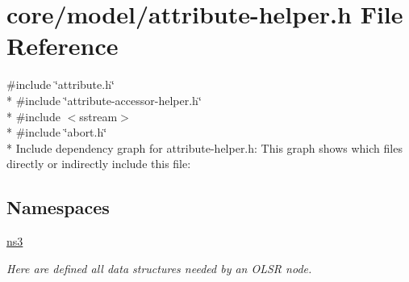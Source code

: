 \hypertarget{attribute-helper_8h}{}\section{core/model/attribute-\/helper.h File Reference}
\label{attribute-helper_8h}
{\ttfamily \#include \char`\"{}attribute.\+h\char`\"{}}\\*
{\ttfamily \#include \char`\"{}attribute-\/accessor-\/helper.\+h\char`\"{}}\\*
{\ttfamily \#include $<$sstream$>$}\\*
{\ttfamily \#include \char`\"{}abort.\+h\char`\"{}}\\*
Include dependency graph for attribute-\/helper.h\+:
This graph shows which files directly or indirectly include this file\+:
\subsection*{Namespaces}
\begin{DoxyCompactItemize}
\item 
 \hyperlink{namespacens3}{ns3}
\begin{DoxyCompactList}\small\item\em Here are defined all data structures needed by an O\+L\+SR node. \end{DoxyCompactList}\end{DoxyCompactItemize}
